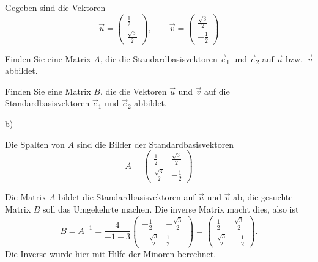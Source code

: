 Gegeben sind die Vektoren
\[
\vec u = \begin{pmatrix}\frac12\\\frac{\sqrt{3}}2\end{pmatrix},
\qquad
\vec v = \begin{pmatrix}\frac{\sqrt{3}}2\\-\frac12\end{pmatrix}
\]
\begin{teilaufgaben}
\item
Finden Sie eine Matrix $A$, die die Standardbasisvektoren $\vec e_1$ und
$\vec e_2$ auf $\vec u$ bzw.~$\vec v$ abbildet.
\item
Finden Sie eine Matrix $B$, die die Vektoren $\vec u$ und $\vec v$ auf
die Standardbasisvektoren $\vec e_1$ und $\vec e_2$ abbildet.
\end{teilaufgaben}

\begin{hinweis}
b) 
\end{hinweis}


\begin{loesung}
\begin{teilaufgaben}
\item Die Spalten von $A$ sind die Bilder der Standardbasisvektoren
\[
A=\begin{pmatrix}
\frac12         &\frac{\sqrt{3}}2\\
\frac{\sqrt{3}}2&-\frac12
\end{pmatrix} 
\]
\item
Die Matrix $A$ bildet die Standardbasisvektoren auf $\vec u$ und $\vec v$
ab, die gesuchte Matrix $B$ soll das Umgekehrte machen.
Die inverse Matrix macht dies, also ist 
\[
B=A^{-1} = \dfrac{4}{-1-3}\begin{pmatrix}
-\frac12         &-\frac{\sqrt{3}}2\\
-\frac{\sqrt{3}}2&\frac12
\end{pmatrix} 
= \begin{pmatrix}
\frac12         &\frac{\sqrt{3}}2\\
\frac{\sqrt{3}}2&-\frac12
\end{pmatrix} .
\]
Die Inverse wurde hier mit Hilfe der Minoren berechnet.
\qedhere
\end{teilaufgaben}
\end{loesung}



